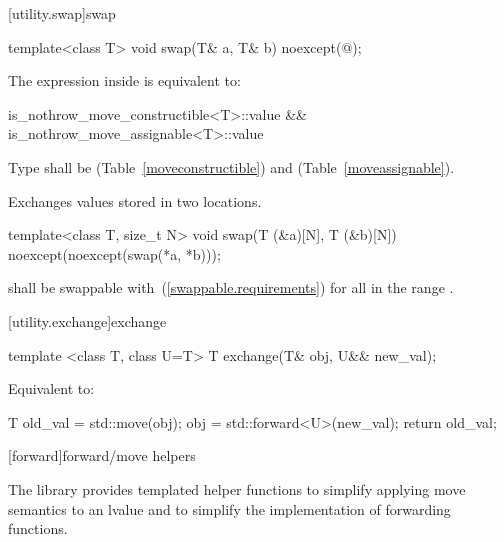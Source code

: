 [utility.swap]{swap}

%
\begin{itemdecl}
template<class T> void swap(T& a, T& b) noexcept(@\seebelow@);
\end{itemdecl}

\begin{itemdescr}
\pnum
\remark The expression inside  is equivalent to:

\begin{codeblock}
is_nothrow_move_constructible<T>::value &&
is_nothrow_move_assignable<T>::value
\end{codeblock}

\pnum
\requires
Type
shall be
 (Table~\ref{moveconstructible})
and
 (Table~\ref{moveassignable}).

\pnum
\effects
Exchanges values stored in two locations.
\end{itemdescr}

%
\begin{itemdecl}
template<class T, size_t N>
  void swap(T (&a)[N], T (&b)[N]) noexcept(noexcept(swap(*a, *b)));
\end{itemdecl}

\begin{itemdescr}
\pnum
\requires
{} shall be swappable with~(\ref{swappable.requirements}) 
for all  in the range .

\pnum
\effects {}
\end{itemdescr}

[utility.exchange]{exchange}

\begin{itemdecl}
template <class T, class U=T> T exchange(T& obj, U&& new_val);
\end{itemdecl}

\begin{itemdescr}
\pnum
\effects
Equivalent to:

\begin{codeblock}
T old_val = std::move(obj);
obj = std::forward<U>(new_val);
return old_val;
\end{codeblock}
\end{itemdescr}


[forward]{forward/move helpers}

\pnum
The library provides templated helper functions to simplify
applying move semantics to an lvalue and to simplify the implementation
of forwarding functions.

